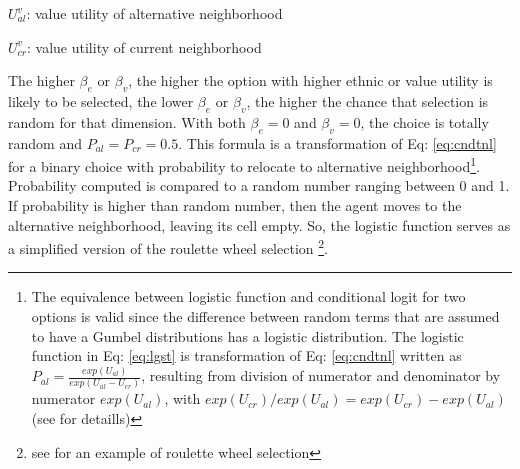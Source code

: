 \documentclass[
]{article}
\begin{document}
\par

\(U^v_{al}\): value utility of alternative neighborhood

\par

\(U^v_{cr}\): value utility of current neighborhood

\par

The higher \(\beta_e\) or \(\beta_v\), the higher the option with higher
ethnic or value utility is likely to be selected, the lower \(\beta_e\)
or \(\beta_v\), the higher the chance that selection is random for that
dimension. With both \(\beta_e = 0\) and \(\beta_v = 0\), the choice is
totally random and \(P_{al} = P_{cr} = 0.5\). This formula is a
transformation of Eq: \ref{eq:cndtnl} for a binary choice with
probability to relocate to alternative
neighborhood\footnote{The equivalence between logistic function  and conditional logit for two options is valid since the difference between random terms that are assumed to have a Gumbel distributions has a logistic distribution. The logistic function in Eq: \ref{eq:lgst} is transformation of Eq: \ref{eq:cndtnl} written as $P_{al} = \frac{exp(U_{al})}{exp(U_{al}-U_{cr})}$, resulting from division of numerator and denominator by numerator $exp(U_{al})$, with $exp(U_{cr})/exp(U_{al}) = exp(U_{cr}) - exp(U_{al})$ (see \cite[p.39]{train2009discrete} for detaills)}.
Probability computed is compared to a random number ranging between 0
and 1. If probability is higher than random number, then the agent moves
to the alternative neighborhood, leaving its cell empty. So, the
logistic function serves as a simplified version of the roulette wheel
selection
\footnote{see \cite{bruch2012methodological} for an example of roulette wheel selection}.
\end{document}
